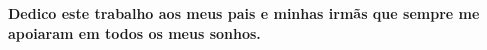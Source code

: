 

\begin{dedicatoria}
   \vspace*{\fill}
   \centering
   \noindent
	\textbf{Dedico este trabalho aos meus pais e minhas irmãs que sempre me apoiaram em todos os meus sonhos.}

   
\end{dedicatoria}
